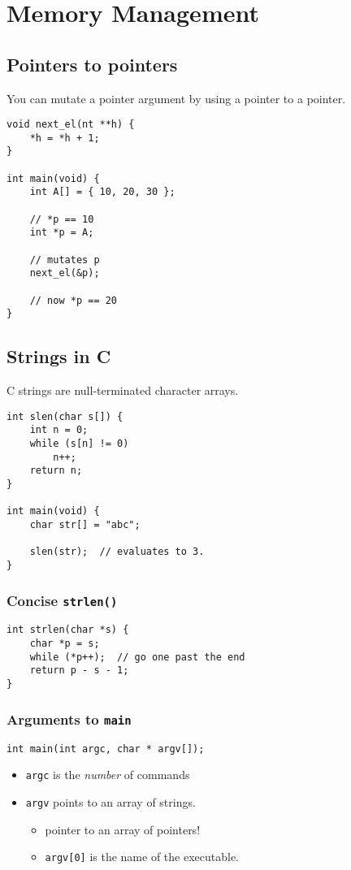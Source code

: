 \chapter{Memory Management}
\section{Pointers to pointers}
You can mutate a pointer argument by using a pointer to a pointer.
\begin{verbatim}
void next_el(nt **h) {
	*h = *h + 1;
}

int main(void) {
	int A[] = { 10, 20, 30 };
	
	// *p == 10
	int *p = A;
	
	// mutates p
	next_el(&p);
	
	// now *p == 20
}
\end{verbatim}
\section{Strings in C}
C strings are null-terminated character arrays.
\begin{verbatim}
int slen(char s[]) {
	int n = 0;
	while (s[n] != 0)
		n++;
	return n;
}

int main(void) {
	char str[] = "abc";
	
	slen(str);  // evaluates to 3.
}
\end{verbatim}

\subsection{Concise \texttt{strlen()}}
\begin{verbatim}
int strlen(char *s) {
	char *p = s;
	while (*p++);  // go one past the end
	return p - s - 1;
}
\end{verbatim}

\subsection{Arguments to \texttt{main}}
\begin{verbatim}
int main(int argc, char * argv[]);
\end{verbatim}
\begin{itemize}
	\item \texttt{argc} is the \emph{number} of commands
	\item \texttt{argv} points to an array of strings.
		\begin{itemize}
			\item pointer to an array of pointers!
			\item \texttt{argv[0]} is the name of the executable.
		\end{itemize}
\end{itemize}

